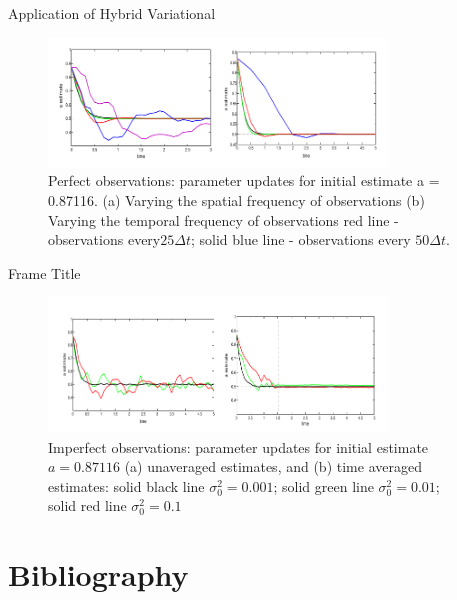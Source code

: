 \documentclass{beamer}
\begin{document}
\begin{frame}{Application of Hybrid Variational}
\begin{figure}[h]
    \begin{center}
    \includegraphics[width=9cm]{./Image/perfectObsAdvection.png}
    \caption{Perfect observations: parameter updates for initial estimate a = 0.87116.
(a) Varying the spatial frequency of observations (b) Varying the temporal frequency
of observations
red line - observations every$25\Delta t$; solid blue line - observations every $50\Delta t$.}
    \label{perfectObs}
    \end{center}
\end{figure}
\end{frame}

\begin{frame}{Frame Title}
\begin{figure}[h]
    \begin{center}
    \includegraphics[width=9cm]{./Image/noisyObs.png}
    \caption{Imperfect observations: parameter updates for initial estimate $a = 0.87116$ (a) unaveraged estimates, and (b) time averaged estimates: solid black line $\sigma_0^2 = 0.001$; solid green line $\sigma_0^2 = 0.01$; solid red line $\sigma_0^2= 0.1$}
    \label{noisyObs}
    \end{center}
\end{figure}
\end{frame}
\section*{Bibliography}
\begin{frame}

\nocite{*}

\end{frame}
\end{document}
